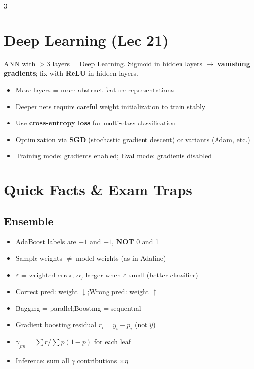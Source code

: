 \documentclass[8pt,letterpaper]{extarticle}
\begin{document}
\begin{multicols}{3}
\section{Deep Learning (Lec 21)}

ANN with $>3$ layers = Deep Learning. Sigmoid in hidden layers $\to$ \textbf{vanishing gradients}; fix with \textbf{ReLU} in hidden layers.
\begin{itemize}
  \item More layers = more abstract feature representations
  \item Deeper nets require careful weight initialization to train stably
  \item Use \textbf{cross-entropy loss} for multi-class classification
  \item Optimization via \textbf{SGD} (stochastic gradient descent) or variants (Adam, etc.)
  \item Training mode: gradients enabled; Eval mode: gradients disabled
\end{itemize}

\section{Quick Facts \& Exam Traps}

\subsection{Ensemble}
\begin{itemize}
  \item AdaBoost labels are $-1$ and $+1$, \textbf{NOT} 0 and 1
  \item Sample weights $\neq$ model weights (as in Adaline)
  \item $\varepsilon$ = weighted error; $\alpha_j$ larger when $\varepsilon$ small (better classifier)
  \item Correct pred: weight $\downarrow$;\quad Wrong pred: weight $\uparrow$
  \item Bagging = parallel;\quad Boosting = sequential
  \item Gradient boosting residual $r_i = y_i - p_i$ (not $\hat{y}$)
  \item $\gamma_{jm} = \sum r / \sum p(1-p)$ for each leaf
  \item Inference: sum all $\gamma$ contributions $\times \eta$
\end{itemize}


\end{multicols}
\end{document}
